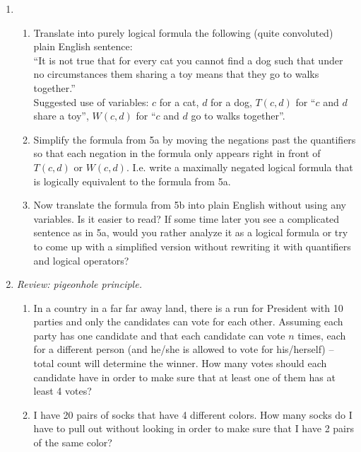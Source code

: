 \documentclass[12pt]{amsart}
\begin{document}
\begin{enumerate}[label=\arabic*.,itemsep=10pt, leftmargin=*]
\item  
    \begin{enumerate}[label=\alph*.,itemsep=5pt, leftmargin=*]
    \item
    Translate into purely logical formula the following (quite convoluted) plain English sentence:
    \\
    ``It is not true that for every cat you cannot find a dog such that under no circumstances them sharing a toy means that they go to walks together.''
    \\
    Suggested use of variables: $c$ for a cat, $d$ for a dog, $T(c,d)$ for ``$c$ and $d$ share a toy'', $W(c,d)$ for ``$c$ and $d$ go to walks together''.
    \item 
    Simplify the formula from 5a by moving the negations past the quantifiers so that each negation in the formula only appears right in front of $T(c,d)$ or $W(c,d)$. I.e. write a maximally negated logical formula that is logically equivalent to the formula from 5a.
    \item
    Now translate the formula from 5b into plain English without using any variables. Is it easier to read? If some time later you see a complicated sentence as in 5a, would you rather analyze it as a logical formula or try to come up with a simplified version without rewriting it with quantifiers and logical operators?
    \end{enumerate}
    
    
\item
    \textit{Review: pigeonhole principle.}
    \begin{enumerate}
        \item In a country in a far far away land, there is a run for President with 10 parties and only the candidates can vote for each other.
        Assuming each party has one candidate
        and that each candidate can vote $n$ times, each for a different person (and he/she is allowed to vote for his/herself) -- total count will determine the winner.
        How many votes should each candidate have in order to make sure that at least one of them has at least 4 votes?
        
        \item I have 20 pairs of socks that have 4 different colors.
        How many socks do I have to pull out without looking in order to make sure that I have 2 pairs of the same color?
    \end{enumerate} 
    




\end{enumerate}
\end{document}
